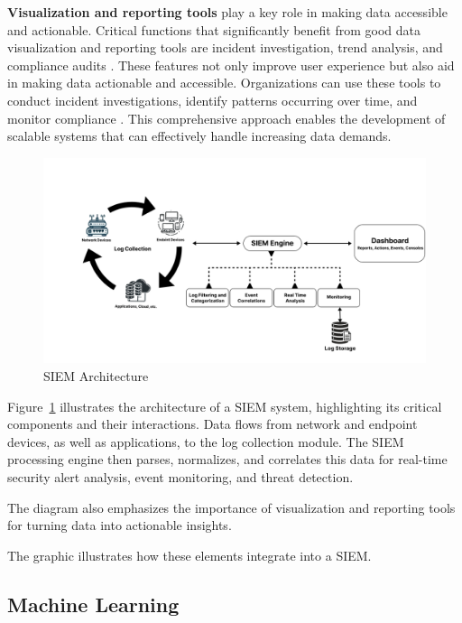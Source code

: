 \textbf{Visualization and reporting tools} play a key role in making data accessible and actionable.
Critical functions that significantly benefit from good data visualization and reporting tools are incident investigation, trend analysis, and compliance audits \parencite{Sheeraz2023}. 
These features not only improve user experience but also aid in making data actionable and accessible. 
Organizations can use these tools to conduct incident investigations, identify patterns occurring over time, and monitor compliance \parencite{Sheeraz2023}. 
This comprehensive approach enables the development of scalable systems that can effectively handle increasing data demands.

\clearpage

\begin{figure}[ht]
    \centering
    \includegraphics[width=\textwidth]{ch2/assets/FinalGraph.png}
    \caption{SIEM Architecture}
    \label{fig:siem-arc}
\end{figure}

Figure~\ref{fig:siem-arc} illustrates the architecture of a \gls{SIEM} system, highlighting its critical components and their interactions. 
Data flows from network and endpoint devices, as well as applications, to the log collection module. 
The \gls{SIEM} processing engine then parses, normalizes, and correlates this data for real-time security alert analysis, event monitoring, and threat detection.

The diagram also emphasizes the importance of visualization and reporting tools for turning data into actionable insights.

The graphic illustrates how these elements integrate into a SIEM.

\subsection{Machine Learning}

